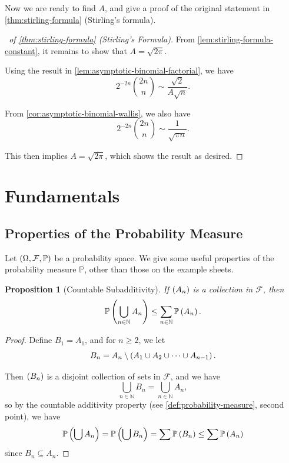 \documentclass{article}
\newtheorem{proposition}[theorem]{Proposition}
\theoremstyle{definition}
\theoremstyle{remark}
\newcommand{\NN}{\mathbb{N}}
\newcommand{\Prob}{\mathbb{P}}
\newcommand{\eventSpace}{\mathcal{F}}
\begin{document}
Now we are ready to find \(A\), and give a proof of the original statement in \autoref{thm:stirling-formula} (Stirling's formula).

\begin{proof}[\proofname\ of \autoref{thm:stirling-formula} (Stirling's Formula)]
    From \autoref{lem:stirling-formula-constant}, it remains to show that \(A = \sqrt{2 \pi}\).
    
    Using the result in \autoref{lem:asymptotic-binomial-factorial}, we have
    \[
        2^{-2n} \binom{2n}{n} \sim \frac{\sqrt{2}}{A \sqrt{n}}.
    \]

    From \autoref{cor:asymptotic-binomial-wallis}, we also have
    \[
        2^{-2n} \binom{2n}{n} \sim \frac{1}{\sqrt{\pi n}}.
    \]
    
    This then implies \(A = \sqrt{2 \pi}\), which shows the result as desired.
\end{proof}



\section{Fundamentals}

\subsection{Properties of the Probability Measure}

Let \(\pqty{\Omega, \eventSpace, \Prob}\) be a probability space. We give some useful properties of the probability measure \(\Prob\), other than those on the example sheets.

\begin{proposition}[Countable Subadditivity]
    \label{prop:countable-subadditivity}%
    If \(\left(A_n\right)\) is a collection in \(\eventSpace\), then
    \[
        \Prob\pqty{\bigcup_{n \in \NN} A_n} \leq \sum_{n \in \NN} \Prob\pqty{A_n}.
    \]
\end{proposition}

\begin{proof}
    Define \(B_1 = A_1\), and for \(n \geq 2\), we let
    \[
        B_n = A_n \setminus \left(A_1 \cup A_2 \cup \cdots \cup A_{n - 1}\right).
    \]

    Then \(\left(B_n\right)\) is a disjoint collection of sets in \(\eventSpace\), and we have
    \[
        \bigcup_{n \in \NN} B_n = \bigcup_{n \in \NN} A_n,
    \]
    so by the countable additivity property (see \autoref{def:probability-measure}, second point), we have
    \[
        \Prob\pqty{\bigcup A_n} = \Prob\pqty{\bigcup B_n} = \sum \Prob\pqty{B_n} \leq \sum \Prob\pqty{A_n}
    \]
    since \(B_n \subseteq A_n\).
\end{proof}
\end{document}
